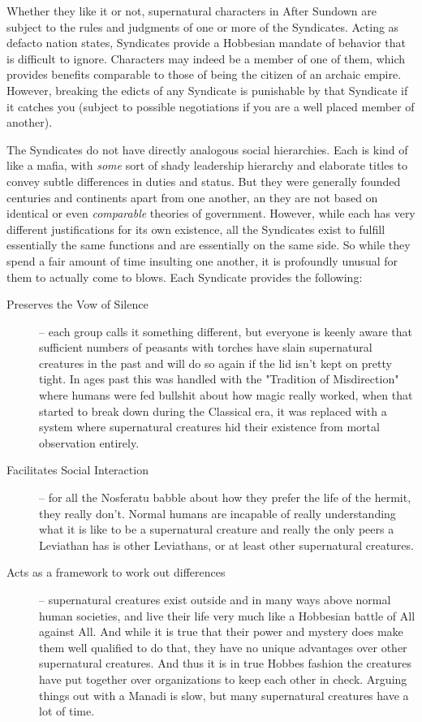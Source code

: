 Whether they like it or not, supernatural characters in After Sundown are subject to the rules and judgments of one or more of the Syndicates. Acting as defacto nation states, Syndicates provide a Hobbesian mandate of behavior that is difficult to ignore. Characters may indeed be a member of one of them, which provides benefits comparable to those of being the citizen of an archaic empire. However, breaking the edicts of any Syndicate is punishable by that Syndicate if it catches you (subject to possible negotiations if you are a well placed member of another).

The Syndicates do not have directly analogous social hierarchies. Each is kind of like a mafia, with \textit{some} sort of shady leadership hierarchy and elaborate titles to convey subtle differences in duties and status. But they were generally founded centuries and continents apart from one another, an they are not based on identical or even \textit{comparable} theories of government. However, while each has very different justifications for its own existence, all the Syndicates exist to fulfill essentially the same functions and are essentially on the same side. So while they spend a fair amount of time insulting one another, it is profoundly unusual for them to actually come to blows. Each Syndicate provides the following:

\begin{description}
\item[Preserves the Vow of Silence] -- each group calls it something different, but everyone is keenly aware that sufficient numbers of peasants with torches have slain supernatural creatures in the past and will do so again if the lid isn't kept on pretty tight. In ages past this was handled with the "Tradition of Misdirection" where humans were fed bullshit about how magic really worked, when that started to break down during the Classical era, it was replaced with a system where supernatural creatures hid their existence from mortal observation entirely.
\item[Facilitates Social Interaction] -- for all the Nosferatu babble about how they prefer the life of the hermit, they really don't. Normal humans are incapable of really understanding what it is like to be a supernatural creature and really the only peers a Leviathan has is other Leviathans, or at least other supernatural creatures.
\item[Acts as a framework to work out differences] -- supernatural creatures exist outside and in many ways above normal human societies, and live their life very much like a Hobbesian battle of All against All. And while it is true that their power and mystery does make them well qualified to do that, they have no unique advantages over other supernatural creatures. And thus it is in true Hobbes fashion the creatures have put together over organizations to keep each other in check. Arguing things out with a Manadi is slow, but many supernatural creatures have a lot of time.
\end{description}

